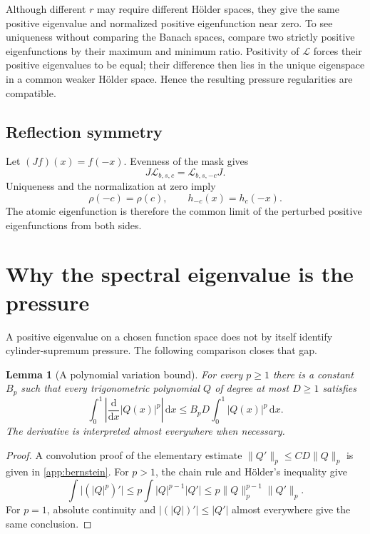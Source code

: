 \documentclass[11pt,a4paper]{article}
\numberwithin{equation}{section}
\newtheorem{lemma}[lemma]{Lemma}
\theoremstyle{definition}
\theoremstyle{remark}
\newcommand{\dd}{\,\mathrm d}
\newcommand{\Lop}{\mathcal L}
\begin{document}
Although different $r$ may require different H\"older spaces, they give
the same positive eigenvalue and normalized positive eigenfunction near
zero. To see uniqueness without comparing the Banach spaces, compare
two strictly positive eigenfunctions by their maximum and minimum ratio.
Positivity of $\Lop$ forces their positive eigenvalues to be equal; their
difference then lies in the unique eigenspace in a common weaker
H\"older space. Hence the resulting pressure regularities are compatible.

\subsection{Reflection symmetry}
Let $(Jf)(x)=f(-x)$. Evenness of the mask gives
\[
 J\Lop_{b,s,c}=\Lop_{b,s,-c}J.
\]
Uniqueness and the normalization at zero imply
\begin{equation}
 \rho(-c)=\rho(c),\qquad h_{-c}(x)=h_c(-x).
 \label{eq:reflection}
\end{equation}
The atomic eigenfunction is therefore the common limit of the perturbed
positive eigenfunctions from both sides.

\section{Why the spectral eigenvalue is the pressure}
\label{sec:pressure}

A positive eigenvalue on a chosen function space does not by itself
identify cylinder-supremum pressure. The following comparison closes
that gap.

\begin{lemma}[A polynomial variation bound]
\label{lem:bernstein}
For every $p\ge1$ there is a constant $B_p$ such that every trigonometric
polynomial $Q$ of degree at most $D\ge1$ satisfies
\begin{equation}
 \int_0^1\left|\frac{\mathrm d}{\mathrm dx}|Q(x)|^p\right|\dd x
 \le B_pD\int_0^1|Q(x)|^p\dd x.
 \label{eq:variation}
\end{equation}
The derivative is interpreted almost everywhere when necessary.
\end{lemma}
\begin{proof}
A convolution proof of the elementary estimate
$\|Q'\|_p\le CD\|Q\|_p$ is given in \cref{app:bernstein}.
For $p>1$, the chain rule and H\"older's inequality give
\[
 \int\bigl|(|Q|^p)'\bigr|
 \le p\int|Q|^{p-1}|Q'|
 \le p\|Q\|_p^{p-1}\|Q'\|_p.
\]
For $p=1$, absolute continuity and $\bigl|(|Q|)'\bigr|\le|Q'|$
almost everywhere give the same conclusion.
\end{proof}
\end{document}
